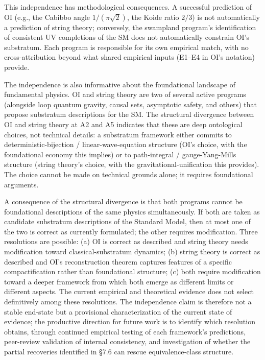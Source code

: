 \documentclass[
]{article}
\begin{document}
This independence has methodological consequences. A successful
prediction of OI (e.g., the Cabibbo angle \(1/(\pi\sqrt{2})\), the Koide
ratio \(2/3\)) is not automatically a prediction of string theory;
conversely, the swampland program's identification of consistent UV
completions of the SM does not automatically constrain OI's substratum.
Each program is responsible for its own empirical match, with no
cross-attribution beyond what shared empirical inputs (E1--E4 in OI's
notation) provide.

The independence is also informative about the foundational landscape of
fundamental physics. OI and string theory are two of several active
programs (alongside loop quantum gravity, causal sets, asymptotic
safety, and others) that propose substratum descriptions for the SM. The
structural divergence between OI and string theory at A2 and A5
indicates that these are deep ontological choices, not technical
details: a substratum framework either commits to
deterministic-bijection / linear-wave-equation structure (OI's choice,
with the foundational economy this implies) or to path-integral /
gauge-Yang-Mills structure (string theory's choice, with the
gravitational-unification this provides). The choice cannot be made on
technical grounds alone; it requires foundational arguments.

A consequence of the structural divergence is that both programs cannot
be foundational descriptions of the same physics simultaneously. If both
are taken as candidate substratum descriptions of the Standard Model,
then at most one of the two is correct as currently formulated; the
other requires modification. Three resolutions are possible: (a) OI is
correct as described and string theory needs modification toward
classical-substratum dynamics; (b) string theory is correct as described
and OI's reconstruction theorem captures features of a specific
compactification rather than foundational structure; (c) both require
modification toward a deeper framework from which both emerge as
different limits or different aspects. The current empirical and
theoretical evidence does not select definitively among these
resolutions. The independence claim is therefore not a stable end-state
but a provisional characterization of the current state of evidence; the
productive direction for future work is to identify which resolution
obtains, through continued empirical testing of each framework's
predictions, peer-review validation of internal consistency, and
investigation of whether the partial recoveries identified in §7.6 can
rescue equivalence-class structure.
\end{document}

